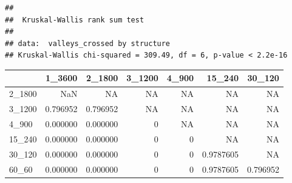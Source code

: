 \documentclass[
]{book}
\newenvironment{Shaded}{\begin{snugshade}}{\end{snugshade}}
\newcommand{\AttributeTok}[1]{\textcolor[rgb]{0.77,0.63,0.00}{#1}}
\newcommand{\ConstantTok}[1]{\textcolor[rgb]{0.00,0.00,0.00}{#1}}
\newcommand{\FunctionTok}[1]{\textcolor[rgb]{0.00,0.00,0.00}{#1}}
\newcommand{\NormalTok}[1]{#1}
\newcommand{\OtherTok}[1]{\textcolor[rgb]{0.56,0.35,0.01}{#1}}
\newcommand{\SpecialCharTok}[1]{\textcolor[rgb]{0.00,0.00,0.00}{#1}}
\newcommand{\StringTok}[1]{\textcolor[rgb]{0.31,0.60,0.02}{#1}}
\begin{document}
\begin{verbatim}
## 
##  Kruskal-Wallis rank sum test
## 
## data:  valleys_crossed by structure
## Kruskal-Wallis chi-squared = 309.49, df = 6, p-value < 2.2e-16
\end{verbatim}

\begin{Shaded}
\end{Shaded}

\begin{table}
\centering
\begin{tabular}[t]{l|r|r|r|r|r|r}
\hline
  & 1\_3600 & 2\_1800 & 3\_1200 & 4\_900 & 15\_240 & 30\_120\\
\hline
2\_1800 & NaN & NA & NA & NA & NA & NA\\
\hline
3\_1200 & 0.796952 & 0.796952 & NA & NA & NA & NA\\
\hline
4\_900 & 0.000000 & 0.000000 & 0 & NA & NA & NA\\
\hline
15\_240 & 0.000000 & 0.000000 & 0 & 0 & NA & NA\\
\hline
30\_120 & 0.000000 & 0.000000 & 0 & 0 & 0.9787605 & NA\\
\hline
60\_60 & 0.000000 & 0.000000 & 0 & 0 & 0.9787605 & 0.796952\\
\hline
\end{tabular}
\end{table}
\end{document}
